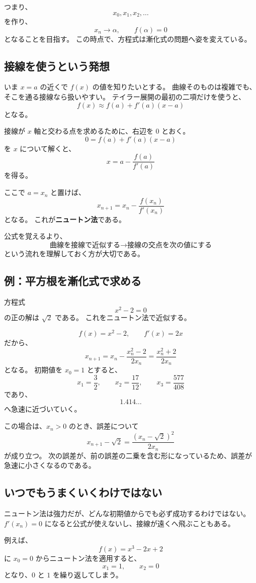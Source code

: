 つまり、
\[
  x_0,x_1,x_2,\ldots
\]
を作り、
\[
  x_n\longrightarrow \alpha,\qquad f(\alpha)=0
\]
となることを目指す。
この時点で、方程式は漸化式の問題へ姿を変えている。

\subsection{接線を使うという発想}

いま $x=a$ の近くで $f(x)$ の値を知りたいとする。
曲線そのものは複雑でも、そこを通る接線なら扱いやすい。
テイラー展開の最初の二項だけを使うと、
\[
  f(x)\approx f(a)+f'(a)(x-a)
\]
となる。

接線が $x$ 軸と交わる点を求めるために、右辺を $0$ とおく。
\[
  0=f(a)+f'(a)(x-a)
\]
を $x$ について解くと、
\[
  x=a-\frac{f(a)}{f'(a)}
\]
を得る。

ここで $a=x_n$ と置けば、
\[
  \boxed{
  x_{n+1}=x_n-\frac{f(x_n)}{f'(x_n)}
  }
\]
となる。
これが\textbf{ニュートン法}である。

公式を覚えるより、
\[
  \text{曲線を接線で近似する}
  \longrightarrow
  \text{接線の交点を次の値にする}
\]
という流れを理解しておく方が大切である。

\subsection{例：平方根を漸化式で求める}

方程式
\[
  x^2-2=0
\]
の正の解は $\sqrt2$ である。
これをニュートン法で近似する。

\[
  f(x)=x^2-2,\qquad f'(x)=2x
\]
だから、
\[
  x_{n+1}
  =x_n-\frac{x_n^2-2}{2x_n}
  =\frac{x_n^2+2}{2x_n}
\]
となる。
初期値を $x_0=1$ とすると、
\[
  x_1=\frac32,\qquad
  x_2=\frac{17}{12},\qquad
  x_3=\frac{577}{408}
\]
であり、
\[
  1.414\ldots
\]
へ急速に近づいていく。

この場合は、$x_n>0$ のとき、誤差について
\[
  x_{n+1}-\sqrt2
  =\frac{(x_n-\sqrt2)^2}{2x_n}
\]
が成り立つ。
次の誤差が、前の誤差の二乗を含む形になっているため、誤差が急速に小さくなるのである。

\subsection{いつでもうまくいくわけではない}

ニュートン法は強力だが、どんな初期値からでも必ず成功するわけではない。
$f'(x_n)=0$ になると公式が使えないし、接線が遠くへ飛ぶこともある。

例えば、
\[
  f(x)=x^3-2x+2
\]
に $x_0=0$ からニュートン法を適用すると、
\[
  x_1=1,\qquad x_2=0
\]
となり、$0$ と $1$ を繰り返してしまう。

